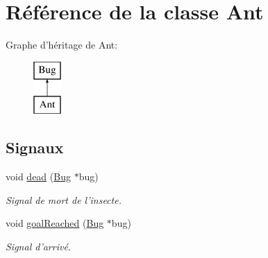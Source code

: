 \hypertarget{classAnt}{
\section{Référence de la classe Ant}
\label{classAnt}
}
Graphe d'héritage de Ant:\begin{figure}[H]
\begin{center}
\leavevmode
\includegraphics[height=2.000000cm]{classAnt}
\end{center}
\end{figure}
\subsection*{Signaux}
\begin{DoxyCompactItemize}
\item 
void \hyperlink{classBug_ab7379f5a0172e2d536e20f3f29915e02}{dead} (\hyperlink{classBug}{Bug} $\ast$bug)
\begin{DoxyCompactList}\small\item\em Signal de mort de l'insecte. \end{DoxyCompactList}\item 
void \hyperlink{classBug_a33f90dffa55e1dce80dc2416c75a53c8}{goalReached} (\hyperlink{classBug}{Bug} $\ast$bug)
\begin{DoxyCompactList}\small\item\em Signal d'arrivé. \end{DoxyCompactList}\end{DoxyCompactItemize}
